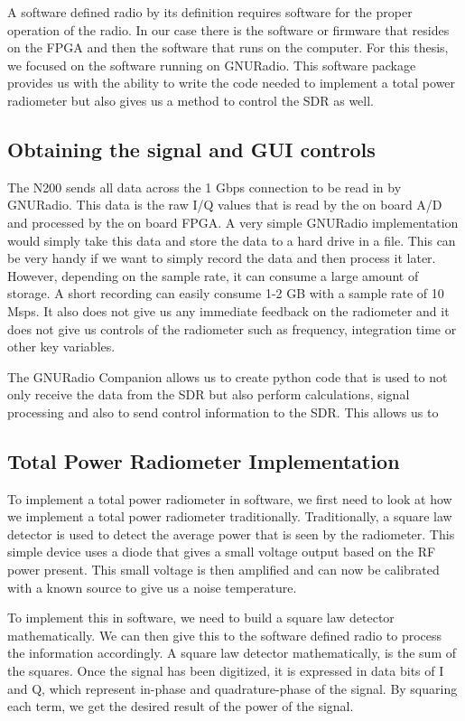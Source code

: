 A software defined radio by its definition requires software for the proper operation of the radio.  In our case there is the software or firmware that resides on the FPGA and then the software that runs on the computer.  For this thesis, we focused on the software running on GNURadio.  This software package provides us with the ability to write the code needed to implement a total power radiometer but also gives us a method to control the SDR as well.  

\subsection{Obtaining the signal and GUI controls}

The N200 sends all data across the 1 Gbps connection to be read in by GNURadio.  This data is the raw I/Q values that is read by the on board A/D and processed by the on board FPGA.  A very simple GNURadio implementation would simply take this data and store the data to a hard drive in a file.  This can be very handy if we want to simply record the data and then process it later.  However, depending on the sample rate, it can consume a large amount of storage.  A short recording can easily consume 1-2 GB with a sample rate of 10 Msps.  It also does not give us any immediate feedback on the radiometer and it does not give us controls of the radiometer such as frequency, integration time or other key variables.  

The GNURadio Companion allows us to create python code that is used to not only receive the data from the SDR but also perform calculations, signal processing and also to send control information to the SDR.  This allows us to 

\subsection{Total Power Radiometer Implementation}
To implement a total power radiometer in software, we first need to look at how we implement a total power radiometer traditionally.  Traditionally, a square law detector is used to detect the average power that is seen by the radiometer.  This simple device uses a diode that gives a small voltage output based on the RF power present.  This small voltage is then amplified and can now be calibrated with a known source to give us a noise temperature.  

To implement this in software, we need to build a square law detector mathematically.  We can then give this to the software defined radio to process the information accordingly.  A square law detector mathematically, is the sum of the squares.  Once the signal has been digitized, it is expressed in data bits of I and Q, which represent in-phase and quadrature-phase of the signal.  By squaring each term, we get the desired result of the power of the signal.

